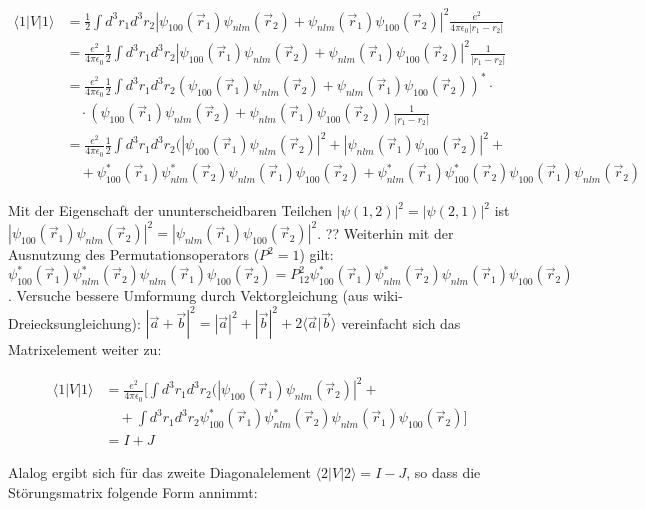 \begin{align}
\langle 1|V|1\rangle &= \frac{1}{2} \int d^3 r_1 d^3r_2 |\psi_{100}(\vec r_1)\psi_{nlm}(\vec r_2)  + \psi_{nlm}(\vec r_1) \psi_{100}(\vec r_2)|^2  \frac{ e^2}{4\pi\epsilon_0 |r_1-r_2|} \\
&=\frac{ e^2}{4\pi\epsilon_0 }  \frac{1}{2} \int d^3 r_1 d^3r_2 |\psi_{100}(\vec r_1)\psi_{nlm}(\vec r_2)  + \psi_{nlm}(\vec r_1) \psi_{100}(\vec r_2)|^2  \frac{ 1}{|r_1-r_2|} \\
&=\frac{ e^2}{4\pi\epsilon_0 }  \frac{1}{2} \int d^3 r_1 d^3r_2 (\psi_{100}(\vec r_1)\psi_{nlm}(\vec r_2)  + \psi_{nlm}(\vec r_1) \psi_{100}(\vec r_2))^*\cdot\\
&\quad \cdot (\psi_{100}(\vec r_1)\psi_{nlm}(\vec r_2)  + \psi_{nlm}(\vec r_1) \psi_{100}(\vec r_2))   \frac{ 1}{|r_1-r_2|} \\
&=\frac{ e^2}{4\pi\epsilon_0 }  \frac{1}{2} \int d^3 r_1 d^3r_2 ( |\psi_{100}(\vec r_1)\psi_{nlm}(\vec r_2)|^2+|\psi_{nlm}(\vec r_1) \psi_{100}(\vec r_2)|^2+\\
&\quad + \psi_{100}^*(\vec r_1)\psi_{nlm}^*(\vec r_2) \psi_{nlm}(\vec r_1) \psi_{100}(\vec r_2) + \psi_{nlm}^*(\vec r_1) \psi_{100}^*(\vec r_2)\psi_{100}(\vec r_1)\psi_{nlm}(\vec r_2)
\end{align}

Mit der Eigenschaft der ununterscheidbaren Teilchen \(|\psi(1,2)|^2 = |\psi(2,1)|^2 \) ist \(|\psi_{100}(\vec r_1)\psi_{nlm}(\vec r_2)|^2 =|\psi_{nlm}(\vec r_1) \psi_{100}(\vec r_2)|^2 \). ?? Weiterhin mit der Ausnutzung des Permutationsoperators (\(P^2=1\)) gilt: \(\psi_{100}^*(\vec r_1)\psi_{nlm}^*(\vec r_2) \psi_{nlm}(\vec r_1) \psi_{100}(\vec r_2) = P_{12}^2  \psi_{100}^*(\vec r_1)\psi_{nlm}^*(\vec r_2) \psi_{nlm}(\vec r_1) \psi_{100}(\vec r_2)\). Versuche bessere Umformung durch Vektorgleichung (aus wiki-Dreiecksungleichung): \( |\vec a + \vec b|^2=|\vec a|^2+|\vec b|^2+2\langle \vec a|\vec b\rangle   \)  vereinfacht sich das Matrixelement weiter zu:

\begin{align}
\langle 1|V|1\rangle &= \frac{ e^2}{4\pi\epsilon_0 } [ \int d^3 r_1 d^3r_2 ( |\psi_{100}(\vec r_1)\psi_{nlm}(\vec r_2)|^2 +\\
&\quad + \int d^3 r_1 d^3r_2 \psi_{100}^*(\vec r_1)\psi_{nlm}^*(\vec r_2) \psi_{nlm}(\vec r_1) \psi_{100}(\vec r_2) ] \\
&= I+J
\end{align}

Alalog ergibt sich für das zweite Diagonalelement \(\langle 2|V|2\rangle =I-J\), so dass die Störungsmatrix folgende Form annimmt:

